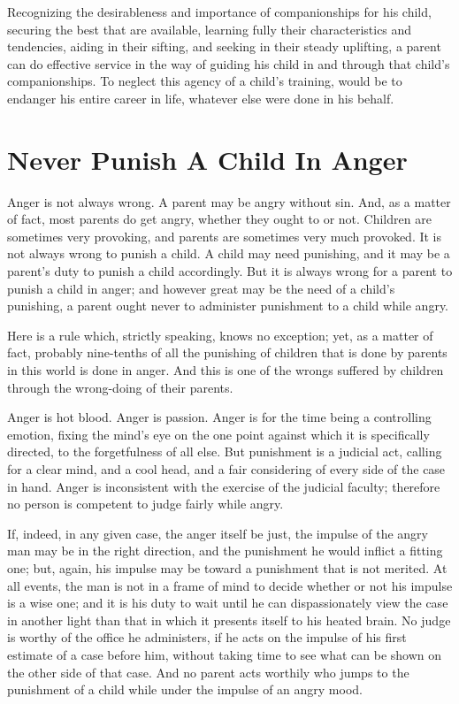 \documentclass[
]{book}
\begin{document}
Recognizing the desirableness and importance of companionships for his child, securing the best that are available, learning fully their characteristics and tendencies, aiding in their sifting, and seeking in their steady uplifting, a parent can do effective service in the way of guiding his child in and through that child's companionships. To neglect this agency of a child's training, would be to endanger his entire career in life, whatever else were done in his behalf.

\hypertarget{never-punish-a-child-in-anger}{%
\chapter{Never Punish A Child In Anger}\label{never-punish-a-child-in-anger}}

Anger is not always wrong. A parent may be angry without sin. And, as a matter of fact, most parents do get angry, whether they ought to or not. Children are sometimes very provoking, and parents are sometimes very much provoked. It is not always wrong to punish a child. A child may need punishing, and it may be a parent's duty to punish a child accordingly. But it is always wrong for a parent to punish a child in anger; and however great may be the need of a child's punishing, a parent ought never to administer punishment to a child while angry.

Here is a rule which, strictly speaking, knows no exception; yet, as a matter of fact, probably nine-tenths of all the punishing of children that is done by parents in this world is done in anger. And this is one of the wrongs suffered by children through the wrong-doing of their parents.

Anger is hot blood. Anger is passion. Anger is for the time being a controlling emotion, fixing the mind's eye on the one point against which it is specifically directed, to the forgetfulness of all else. But punishment is a judicial act, calling for a clear mind, and a cool head, and a fair considering of every side of the case in hand. Anger is inconsistent with the exercise of the judicial faculty; therefore no person is competent to judge fairly while angry.

If, indeed, in any given case, the anger itself be just, the impulse of the angry man may be in the right direction, and the punishment he would inflict a fitting one; but, again, his impulse may be toward a punishment that is not merited. At all events, the man is not in a frame of mind to decide whether or not his impulse is a wise one; and it is his duty to wait until he can dispassionately view the case in another light than that in which it presents itself to his heated brain. No judge is worthy of the office he administers, if he acts on the impulse of his first estimate of a case before him, without taking time to see what can be shown on the other side of that case. And no parent acts worthily who jumps to the punishment of a child while under the impulse of an angry mood.
\end{document}
